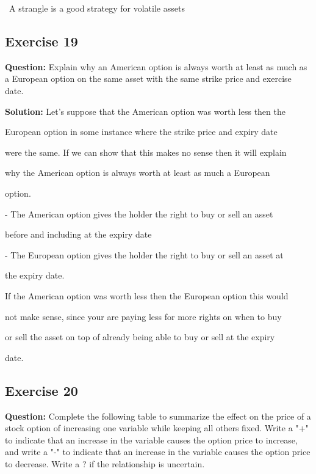 \documentclass{article}
\begin{document}
\, A strangle is a good strategy for volatile assets 

\subsection*{Exercise 19}

\textbf{Question:} Explain why an American option is always worth at least as much as a European option on the
same asset with the same strike price and exercise date.

\textbf{Solution:} 
Let's suppose that the American option was worth less then the 

European option in some instance where the strike price and expiry date 

were the same. If we can show that this makes no sense then it will explain 

why the American option is always worth at least as much a European 

option.

\vspace{\baselineskip}

- The American option gives the holder the right to buy or sell an asset 

before and including at the expiry date

- The European option gives the holder the right to buy or sell an asset at 

the expiry date. 

\vspace{\baselineskip}

If the American option was worth less then the European option this would 

not make sense, since your are paying less for more rights on when to buy 

or sell the asset on top of already being able to buy or sell at the expiry 

date. 

\subsection*{Exercise 20}

\textbf{Question:} Complete the following table to summarize the effect on the price of a stock option of increasing
one variable while keeping all others fixed. Write a "+" to indicate that an increase in the variable causes the option
price to increase, and write a "-" to indicate that an increase in the variable causes the option price to decrease.
Write a ? if the relationship is uncertain.
\end{document}
